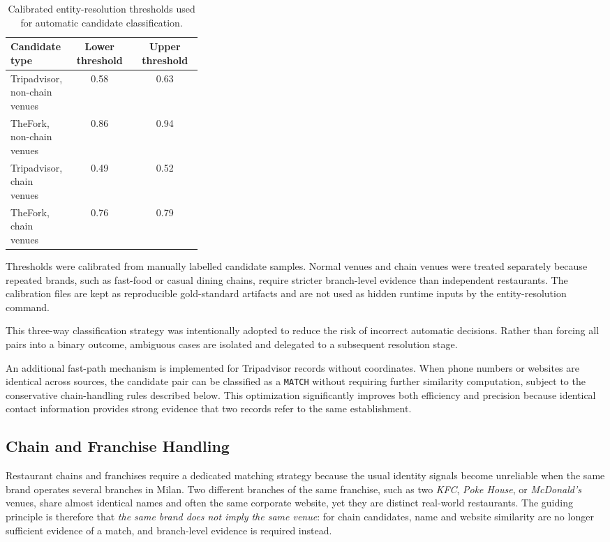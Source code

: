 \begin{table}[t]
\centering
\footnotesize
\begin{tabular}{p{0.32\linewidth}cc}
\toprule
\textbf{Candidate type} & \textbf{Lower threshold} & \textbf{Upper threshold} \\
\midrule
Tripadvisor, non-chain venues & 0.58 & 0.63 \\
TheFork, non-chain venues & 0.86 & 0.94 \\
Tripadvisor, chain venues & 0.49 & 0.52 \\
TheFork, chain venues & 0.76 & 0.79 \\
\bottomrule
\end{tabular}
\caption{Calibrated entity-resolution thresholds used for automatic candidate classification.}
\label{tab:er-thresholds}
\end{table}

Thresholds were calibrated from manually labelled candidate samples. Normal venues and chain venues were treated separately because repeated brands, such as fast-food or casual dining chains, require stricter branch-level evidence than independent restaurants. The calibration files are kept as reproducible gold-standard artifacts and are not used as hidden runtime inputs by the entity-resolution command.

This three-way classification strategy was intentionally adopted to reduce the risk of incorrect automatic decisions. Rather than forcing all pairs into a binary outcome, ambiguous cases are isolated and delegated to a subsequent resolution stage.

An additional fast-path mechanism is implemented for Tripadvisor records without coordinates. When phone numbers or websites are identical across sources, the candidate pair can be classified as a \texttt{MATCH} without requiring further similarity computation, subject to the conservative chain-handling rules described below. This optimization significantly improves both efficiency and precision because identical contact information provides strong evidence that two records refer to the same establishment.

\subsection{Chain and Franchise Handling}

Restaurant chains and franchises require a dedicated matching strategy because the
usual identity signals become unreliable when the same brand operates several
branches in Milan. Two different branches of the same franchise, such as two
\textit{KFC}, \textit{Poke House}, or \textit{McDonald's} venues, share almost
identical names and often the same corporate website, yet they are distinct
real-world restaurants. The guiding principle is therefore that \emph{the same
brand does not imply the same venue}: for chain candidates, name and website
similarity are no longer sufficient evidence of a match, and branch-level evidence
is required instead.

